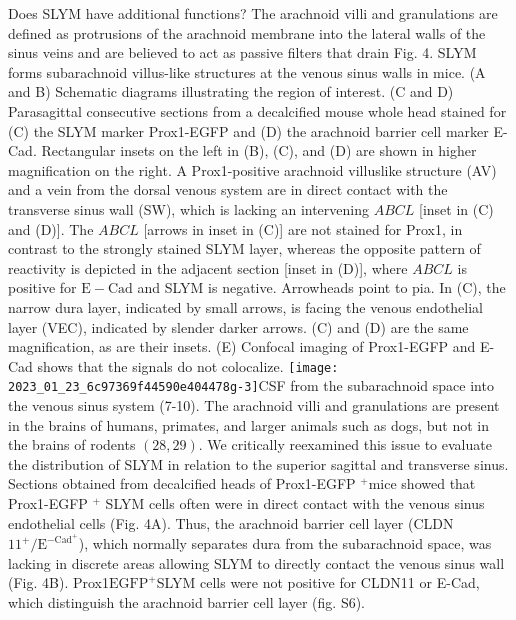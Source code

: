 Does SLYM have additional functions? The arachnoid villi and granulations are defined as protrusions of the arachnoid membrane into the lateral walls of the sinus veins and are believed to act as passive filters that drain Fig. 4. SLYM forms subarachnoid villus-like structures at the venous sinus walls in mice. (A and B) Schematic diagrams illustrating the region of interest. (C and D) Parasagittal consecutive sections from a decalcified mouse whole head stained for (C) the SLYM marker Prox1-EGFP and (D) the arachnoid barrier cell marker E-Cad. Rectangular insets on the left in (B), (C), and (D) are shown in higher magnification on the right. A Prox1-positive arachnoid villuslike structure (AV) and a vein from the dorsal venous system are in direct contact with the transverse sinus wall (SW), which is lacking an intervening $A B C L$ [inset in (C) and (D)]. The $A B C L$ [arrows in inset in (C)] are not stained for Prox1, in contrast to the strongly stained SLYM layer, whereas the opposite pattern of reactivity is depicted in the adjacent section [inset in (D)], where $A B C L$ is positive for $\mathrm{E}-\mathrm{Cad}$ and SLYM is negative. Arrowheads point to pia. In (C), the narrow dura layer, indicated by small arrows, is facing the venous endothelial layer (VEC), indicated by slender darker arrows. (C) and (D) are the same magnification, as are their insets. (E) Confocal imaging of Prox1-EGFP and E-Cad shows that the signals do not colocalize.
\texttt{[image: 2023\_01\_23\_6c97369f44590e404478g-3]}CSF from the subarachnoid space into the venous sinus system (7-10). The arachnoid villi and granulations are present in the brains of humans, primates, and larger animals such as dogs, but not in the brains of rodents $(28,29)$. We critically reexamined this issue to evaluate the distribution of SLYM in relation to the superior sagittal and transverse sinus. Sections obtained from decalcified heads of Prox1-EGFP ${ }^{+}$mice showed that Prox1-EGFP ${ }^{+}$ SLYM cells often were in direct contact with the venous sinus endothelial cells (Fig. 4A). Thus, the arachnoid barrier cell layer (CLDN$11^{+} / \mathrm{E}^{-\mathrm{Cad}^{+}}$), which normally separates dura from the subarachnoid space, was lacking in discrete areas allowing SLYM to directly contact the venous sinus wall (Fig. 4B). Prox1$\mathrm{EGFP}^{+}$SLYM cells were not positive for CLDN11 or E-Cad, which distinguish the arachnoid barrier cell layer (fig. S6).

